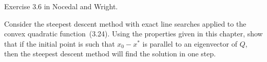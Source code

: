 \begin{problem}
  Exercise 3.6 in Nocedal and Wright.
  
  Consider the steepest descent method with exact line searches applied to the convex quadratic function~(3.24). Using the properties given in this chapter, show that if the initial point is such that ${x_0 - x^{*}}$ is parallel to an eigenvector of $Q$, then the steepest descent method will find the solution in one step.
\end{problem}

